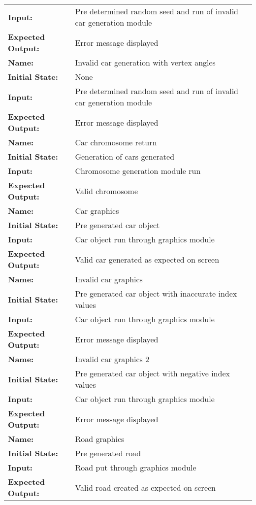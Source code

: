 \documentclass[12pt, titlepage]{article}
\begin{document}
\begin{center}
\begin{longtable}{ l | p{10cm} }
\textbf{Input:} & Pre determined random seed and run of invalid car generation module\\
\textbf{Expected Output:} & Error message displayed\\[0.6em]
\hline
\rule{0pt}{1.5em}\textbf{Name:} & Invalid car generation with vertex angles\\
\textbf{Initial State:} & None\\
\textbf{Input:} & Pre determined random seed and run of invalid car generation module\\
\textbf{Expected Output:} &Error message displayed\\[0.6em]
\hline
\rule{0pt}{1.5em}\textbf{Name:} & Car chromosome return\\
\textbf{Initial State:} & Generation of cars generated\\
\textbf{Input:} & Chromosome generation module run\\
\textbf{Expected Output:} & Valid chromosome\\[0.6em]
\hline
\rule{0pt}{1.5em}\textbf{Name:} & Car graphics\\
\textbf{Initial State:} & Pre generated car object\\
\textbf{Input:} & Car object run through graphics module\\
\textbf{Expected Output:} & Valid car generated as expected on screen\\[0.6em]
\hline
\rule{0pt}{1.5em}\textbf{Name:} & Invalid car graphics\\
\textbf{Initial State:} & Pre generated car object with inaccurate index values\\
\textbf{Input:} & Car object run through graphics module\\
\textbf{Expected Output:} & Error message displayed\\[0.6em]
\hline
\rule{0pt}{1.5em}\textbf{Name:} & Invalid car graphics 2\\
\textbf{Initial State:} & Pre generated car object with negative index values\\
\textbf{Input:} & Car object run through graphics module\\
\textbf{Expected Output:} & Error message displayed\\[0.6em]
\hline
\rule{0pt}{1.5em}\textbf{Name:} & Road graphics\\
\textbf{Initial State:} & Pre generated road\\
\textbf{Input:} & Road put through graphics module\\
\textbf{Expected Output:} & Valid road created as expected on screen\\[0.6em]

\end{longtable}
\end{center}
\end{document}
